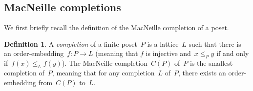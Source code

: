\documentclass{amsart}
\newtheorem{lemma}[theorem]{Lemma}
\theoremstyle{definition}
\newtheorem{definition}[theorem]{Definition}
\newcommand{\ssm}{\smallsetminus} %
\DeclareMathOperator{\tc}{tc} %
\newcommand{\darkblue}{\color{darkblue}} %
\newcommand{\defn}[1]{\textsl{\darkblue #1}} %
\newcommand{\jose}[1]{{\color{red}#1}}
\begin{document}
%
%
%
%


\subsection{MacNeille completions}
\label{subsec:MacNeilleT}

We first briefly recall the definition of the MacNeille completion of a poset.

\begin{definition}
\label{def:MacNeilleCompletion}
A \defn{completion} of a finite poset~$P$ is a lattice~$L$ such that there is an order-embedding~$f : P \to L$ (meaning that \jose{ $f$ is injective and}~$x \le_P y$ if and only if~$f(x) \le_L f(y)$).
The MacNeille completion~$C(P)$ of~$P$ is the smallest completion of~$P$, meaning that for any completion~$L$ of~$P$, there exists an order-embedding from~$C(P)$ to~$L$.
\end{definition}
\end{document}
